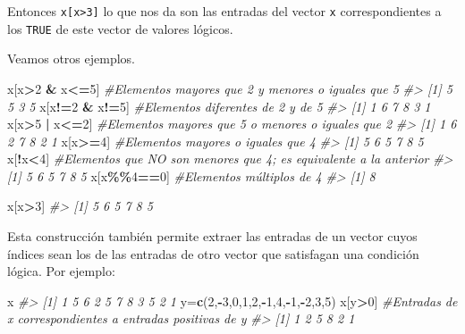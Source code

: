 \documentclass[
]{book}
\newenvironment{Shaded}{\begin{snugshade}}{\end{snugshade}}
\newcommand{\CommentTok}[1]{\textcolor[rgb]{0.56,0.35,0.01}{\textit{#1}}}
\newcommand{\DecValTok}[1]{\textcolor[rgb]{0.00,0.00,0.81}{#1}}
\newcommand{\KeywordTok}[1]{\textcolor[rgb]{0.13,0.29,0.53}{\textbf{#1}}}
\newcommand{\NormalTok}[1]{#1}
\newcommand{\OperatorTok}[1]{\textcolor[rgb]{0.81,0.36,0.00}{\textbf{#1}}}
\newcommand{\StringTok}[1]{\textcolor[rgb]{0.31,0.60,0.02}{#1}}
\theoremstyle{definition}
\theoremstyle{definition}
\theoremstyle{definition}
\theoremstyle{remark}
\begin{document}
Entonces \texttt{x{[}x\textgreater{}3{]}} lo que nos da son las entradas del vector \texttt{x} correspondientes a los \texttt{TRUE} de este vector de valores lógicos.

Veamos otros ejemplos.

\begin{Shaded}
\begin{Highlighting}[]
\NormalTok{x[x}\OperatorTok{\textgreater{}}\DecValTok{2} \OperatorTok{\&}\StringTok{ }\NormalTok{x}\OperatorTok{\textless{}=}\DecValTok{5}\NormalTok{] }\CommentTok{\#Elementos mayores que 2 y menores o iguales que 5}
\CommentTok{\#\textgreater{} [1] 5 5 3 5}
\NormalTok{x[x}\OperatorTok{!=}\DecValTok{2} \OperatorTok{\&}\StringTok{ }\NormalTok{x}\OperatorTok{!=}\DecValTok{5}\NormalTok{] }\CommentTok{\#Elementos diferentes de 2 y de 5}
\CommentTok{\#\textgreater{} [1] 1 6 7 8 3 1}
\NormalTok{x[x}\OperatorTok{\textgreater{}}\DecValTok{5} \OperatorTok{|}\StringTok{ }\NormalTok{x}\OperatorTok{\textless{}=}\DecValTok{2}\NormalTok{] }\CommentTok{\#Elementos mayores que 5 o menores o iguales que 2}
\CommentTok{\#\textgreater{} [1] 1 6 2 7 8 2 1}
\NormalTok{x[x}\OperatorTok{\textgreater{}=}\DecValTok{4}\NormalTok{] }\CommentTok{\#Elementos mayores o iguales que 4}
\CommentTok{\#\textgreater{} [1] 5 6 5 7 8 5}
\NormalTok{x[}\OperatorTok{!}\NormalTok{x}\OperatorTok{\textless{}}\DecValTok{4}\NormalTok{] }\CommentTok{\#Elementos que NO son menores que 4; es equivalente a la anterior}
\CommentTok{\#\textgreater{} [1] 5 6 5 7 8 5}
\NormalTok{x[x}\OperatorTok{\%\%}\DecValTok{4}\OperatorTok{==}\DecValTok{0}\NormalTok{] }\CommentTok{\#Elementos múltiplos de 4}
\CommentTok{\#\textgreater{} [1] 8}
\end{Highlighting}
\end{Shaded}

\begin{Shaded}
\begin{Highlighting}[]
\NormalTok{x[x}\OperatorTok{\textgreater{}}\DecValTok{3}\NormalTok{] }
\CommentTok{\#\textgreater{} [1] 5 6 5 7 8 5}
\end{Highlighting}
\end{Shaded}

Esta construcción también permite extraer las entradas de un vector cuyos índices sean los de las entradas de otro vector que satisfagan una condición lógica. Por ejemplo:

\begin{Shaded}
\begin{Highlighting}[]
\NormalTok{x}
\CommentTok{\#\textgreater{}  [1] 1 5 6 2 5 7 8 3 5 2 1}
\NormalTok{y=}\KeywordTok{c}\NormalTok{(}\DecValTok{2}\NormalTok{,}\OperatorTok{{-}}\DecValTok{3}\NormalTok{,}\DecValTok{0}\NormalTok{,}\DecValTok{1}\NormalTok{,}\DecValTok{2}\NormalTok{,}\OperatorTok{{-}}\DecValTok{1}\NormalTok{,}\DecValTok{4}\NormalTok{,}\OperatorTok{{-}}\DecValTok{1}\NormalTok{,}\OperatorTok{{-}}\DecValTok{2}\NormalTok{,}\DecValTok{3}\NormalTok{,}\DecValTok{5}\NormalTok{)}
\NormalTok{x[y}\OperatorTok{\textgreater{}}\DecValTok{0}\NormalTok{] }\CommentTok{\#Entradas de x correspondientes a entradas positivas de y}
\CommentTok{\#\textgreater{} [1] 1 2 5 8 2 1}
\end{Highlighting}
\end{Shaded}
\end{document}
